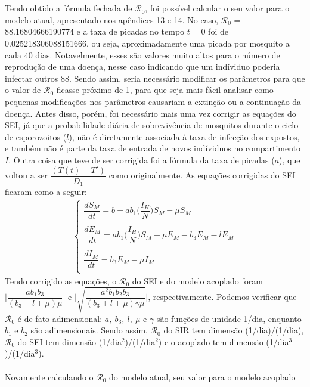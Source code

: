 \\\\
Tendo obtido a fórmula fechada de $\mathcal{R}_0$, foi possível calcular o seu valor para o 
modelo atual, apresentado nos apêndices 13 e 14. No caso, $\mathcal{R}_0$ = 88.16804666190774
e a taxa de picadas no tempo $t=0$ foi de 0.025218306088151666, ou seja, aproximadamente 
uma picada por mosquito a cada 40 dias. Notavelmente, esses são valores muito altos para 
o número de reprodução de uma doença, nesse caso indicando que um indíviduo poderia infectar 
outros 88. Sendo assim, seria necessário modificar os parâmetros para que o valor de 
$\mathcal{R}_0$ ficasse próximo de 1, para que seja mais fácil analisar como pequenas 
modificações nos parâmetros causariam a extinção ou a continuação da doença. 
Antes disso, porém, 
foi necessário mais uma vez corrigir as equações do SEI, já que a probabilidade diária de 
sobrevivência de mosquitos durante o ciclo de esporozoitos ($l$), não é diretamente associada 
à taxa de infecção dos expostos, e também não é parte da taxa de entrada de novos indíviduos 
no compartimento $I$. Outra coisa que teve de ser corrigida foi a fórmula da taxa de picadas 
($a$), que voltou a ser $\dfrac{(T(t) - T')}{D_1}$ como originalmente. As equações corrigidas 
do SEI ficaram como a seguir:
\begin{gather*}
\begin{cases}
\dfrac{dS_M}{dt} = b - ab_1\bigg(\dfrac{I_H}{N}\bigg)S_M - \mu S_M\\
\\
\dfrac{dE_M}{dt} = ab_1\bigg(\dfrac{I_H}{N}\bigg)S_M - \mu E_M - b_3E_M -lE_M\\
\\
\dfrac{dI_M}{dt} = b_3E_M -\mu I_M\\
\end{cases}
\end{gather*}
Tendo corrigido as equações, o $\mathcal{R}_0$ do SEI e 
do modelo acoplado foram 
$\Big | \dfrac{ab_1b_3}{(b_3+l+\mu)\mu}\Big | $ 
e $\Big | \sqrt{\dfrac{a^2b_1b_2b_3}{(b_3+l+\mu)\gamma\mu}}\Big | $, 
respectivamente. 
Podemos verificar que $\mathcal{R}_0$ é de fato 
adimensional: $a, \ b_3, \ l, \ \mu$ e $\gamma$ são funções de 
unidade 1/dia, enquanto $b_1$ e $b_2$ são adimensionais. 
Sendo assim, $\mathcal{R}_0$ do SIR tem dimensão (1/dia)/(1/dia), 
$\mathcal{R}_0$ do SEI tem dimensão (1/dia$^2$)/(1/dia$^2$) e o 
acoplado tem dimensão (1/dia$^3$)/(1/dia$^3$). 
\\\\
Novamente calculando o $\mathcal{R}_0$ do modelo atual, seu valor para o modelo acoplado 
